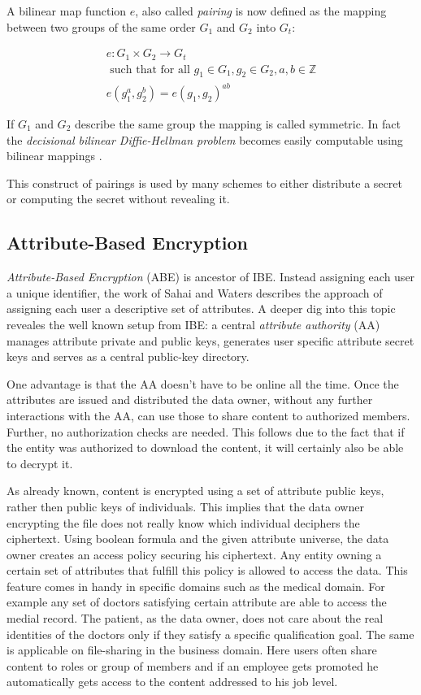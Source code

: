 A bilinear map function $e$, also called \textit{pairing} is now defined as the mapping between two groups of the same order $G_1$ and $G_2$ into $G_t$:

\begin{gather*}
 e : G_1 \times G_2 \rightarrow G_t \\
\text{ such that for all } g_1 \in G_1, g_2 \in G_2, a, b \in \mathbb{Z} \\
e(g_1^a, g_2^b) = e(g_1, g_2)^{ab} 
\end{gather*}

If $G_1$ and $G_2$ describe the same group the mapping is called symmetric. In fact the \textit{decisional bilinear Diffie-Hellman problem} becomes easily computable using bilinear mappings \cite{bethencourt2015intro}.

This construct of pairings is used by many schemes to either distribute a secret or computing the secret without revealing it.

\subsection{Attribute-Based Encryption}
\textit{Attribute-Based Encryption} (\ac{ABE}) is ancestor of IBE. Instead assigning each user a unique identifier, the work of Sahai and Waters \cite{sahai2005fuzzy} describes the approach of assigning each user a descriptive set of attributes. A deeper dig into this topic reveales the well known setup from \ac{IBE}: a central \textit{attribute authority} (\ac{AA}) manages attribute private and public keys, generates user specific attribute secret keys and serves as a central public-key directory. 

One advantage is that the \ac{AA} doesn't have to be online all the time. Once the attributes are issued and distributed the data owner, without any further interactions with the \ac{AA}, can use those to share content to authorized members. Further, no authorization checks are needed. This follows due to the fact that if the entity was authorized to download the content, it will certainly also be able to decrypt it. 

As already known, content is encrypted using a set of attribute public keys, rather then public keys of individuals. This implies that the data owner encrypting the file does not really know which individual deciphers the ciphertext. Using boolean formula and the given attribute universe, the data owner creates an access policy securing his ciphertext. Any entity owning a certain set of attributes that fulfill this policy is allowed to access the data. This feature comes in handy in specific domains such as the medical domain. For example any set of doctors satisfying certain attribute are able to access the medial record. The patient, as the data owner, does not care about the real identities of the doctors only if they satisfy a specific qualification goal. The same is applicable on file-sharing in the business domain. Here users often share content to roles or group of members and if an employee gets promoted he automatically gets access to the content addressed to his job level. 

